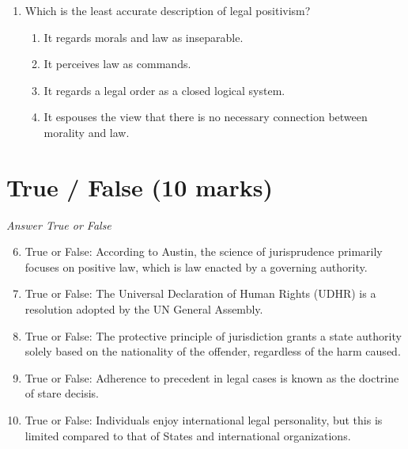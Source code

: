 \documentclass[12pt]{article}
\begin{document}
\begin{enumerate}[label=\arabic*.]
\begin{enumerate}[label=(\alph*)]
    \item It is misinterpreted as a prediction.
    \item His concept of status is misrepresented.
    \item It is taken literally.
    \item His idea is considered inapplicable to Western legal systems.
\end{enumerate}
\item Which is the least accurate description of legal positivism?
\begin{enumerate}[label=(\alph*)]
    \item It regards morals and law as inseparable.
    \item It perceives law as commands.
    \item It regards a legal order as a closed logical system.
    \item It espouses the view that there is no necessary connection between morality and law.
\end{enumerate}
\end{enumerate}

\section*{True / False (10 marks)}
\textit{Answer True or False}
\begin{enumerate}[label=\arabic*.]
\setcounter{enumi}{5}
\item True or False: According to Austin, the science of jurisprudence primarily focuses on positive law, which is law enacted by a governing authority.
\item True or False: The Universal Declaration of Human Rights (UDHR) is a resolution adopted by the UN General Assembly.
\item True or False: The protective principle of jurisdiction grants a state authority solely based on the nationality of the offender, regardless of the harm caused.
\item True or False: Adherence to precedent in legal cases is known as the doctrine of stare decisis.
\item True or False: Individuals enjoy international legal personality, but this is limited compared to that of States and international organizations.
\end{enumerate}
\end{document}
